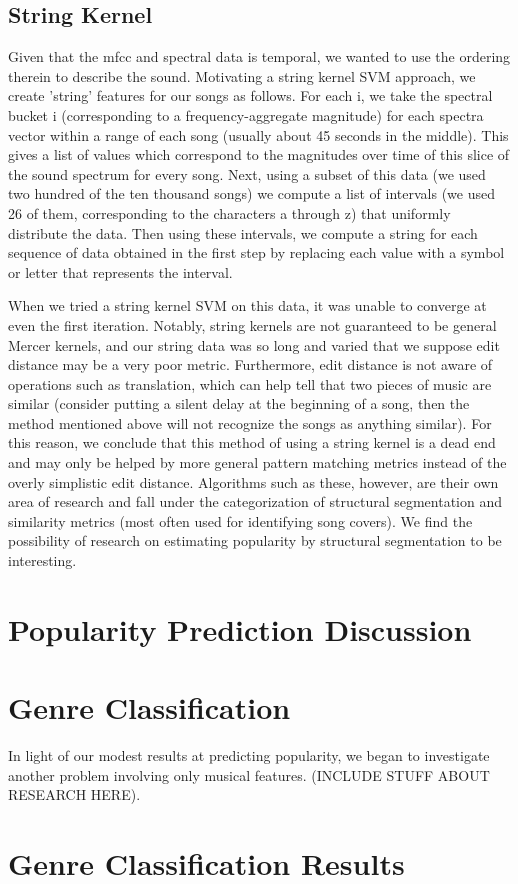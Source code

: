 \documentclass[12pt]{amsart}
\begin{document}
\begin{multicols}{2}
\subsection{String Kernel}
Given that the mfcc and spectral data is temporal, we wanted to use the ordering therein to describe the sound. Motivating a string kernel SVM approach, we create 'string' features for our songs as follows. For each i, we take the spectral bucket i (corresponding to a frequency-aggregate magnitude) for each spectra vector within a range of each song (usually about 45 seconds in the middle). This gives a list of values which correspond to the magnitudes over time of this slice of the sound spectrum for every song. Next, using a subset of this data (we used two hundred of the ten thousand songs) we compute a list of intervals (we used 26 of them, corresponding to the characters a through z)
that uniformly distribute the data. Then using these intervals, we compute a string for each sequence of data obtained in the first step by replacing each value with a symbol or letter that represents the interval.

When we tried a string kernel SVM on this data, it was unable to converge at even the first iteration. Notably, string kernels are not guaranteed to be general Mercer kernels, and our string data was so long and varied that we suppose edit distance may be a very poor metric. Furthermore, edit distance is not aware of operations such as translation, which can help tell that two pieces of music are similar (consider putting a silent delay at the beginning of a song, then the method mentioned above will not recognize the songs as anything similar). For this reason, we conclude that this method of using a string kernel is a dead end and may only be helped by more general pattern matching metrics instead of the overly simplistic edit distance. Algorithms such as these, however, are their own area of research and fall under the categorization of structural segmentation and similarity metrics (most often used for identifying song covers). We find the possibility of research on estimating popularity by structural segmentation to be interesting.
\section{Popularity Prediction Discussion}
\section{Genre Classification}
In light of our modest results at predicting popularity, we began to investigate another problem involving only musical features. (INCLUDE STUFF ABOUT RESEARCH HERE).
\section{Genre Classification Results}



\end{multicols}
\end{document}
